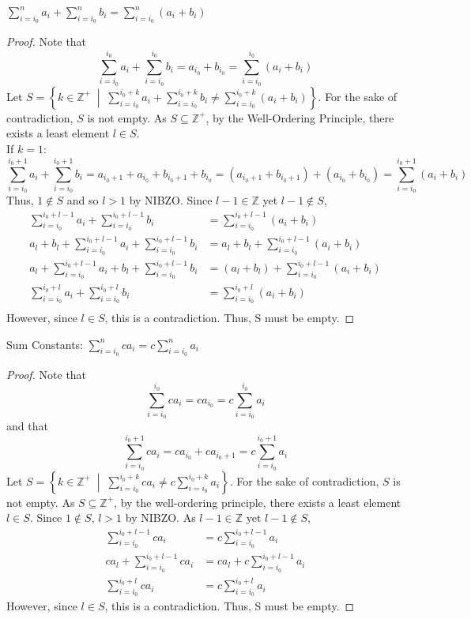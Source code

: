 \begin{lemma} $\sum\limits _{i=i_0}^{n}  a_i + \sum\limits _{i=i_0}^{n}  b_i = \sum\limits _{i=i_0}^{n} (a_i+b_i)$ \end{lemma}
\begin{proof}
Note that \[\sum_{i=i_0}^{i_0}  a_i+ \sum_{i=i_0}^{i_0}  b_i = a_{i_0}+b_{i_0}=\sum_{i=i_0}^{i_0}  (a_i+b_i)\]
Let $S=\left \{k \in \mathbb{Z}^+  \; \middle |  \;\sum\limits_{i=i_0}^{i_0+k}  a_i +  \sum\limits_{i=i_0}^{i_0+k}  b_i \neq  \sum\limits_{i=i_0}^{i_0+k} ( a_i +b_i)\right \}$. For the sake of contradiction, $S$ is not empty. As $S \subseteq \mathbb{Z}^+$, by the Well-Ordering Principle, there exists a least element $l \in S$. \\
If $k=1$: \[
 \sum_{i=i_0}^{i_0+1}  a_i+ \sum_{i=i_0}^{i_0+1}  b_i = a_{i_0+1}+ a_{i_0}+b_{i_0+1}+b_{i_0}= (a_{i_0+1}+b_{i_0+1})+(a_{i_0}+b_{i_0}) =\sum_{i=i_0}^{i_0+1}  (a_i+b_i)
\]
Thus, $1 \notin S$ and so $l>1$ by NIBZO. Since $l-1 \in \mathbb{Z}$ yet $l-1 \notin S$, 
\begin{align*} \sum\limits _{i=i_0}^{i_0+l-1}  a_i + \sum\limits _{i=i_0}^{i_0+l-1}  b_i &= \sum\limits _{i=i_0}^{i_0+l-1} (a_i+b_i) \\
a_l + b_l+\sum\limits _{i=i_0}^{i_0+l-1}  a_i + \sum\limits _{i=i_0}^{i_0+l-1}  b_i &= a_l + b_l+\sum\limits _{i=i_0}^{i_0+l-1} (a_i+b_i)\\
a_l + \sum\limits _{i=i_0}^{i_0+l-1}  a_i + b_l+\sum\limits _{i=i_0}^{i_0+l-1}  b_i &= (a_l + b_l)+\sum\limits _{i=i_0}^{i_0+l-1} (a_i+b_i)\\
\sum\limits _{i=i_0}^{i_0+l}  a_i + \sum\limits _{i=i_0}^{i_0+l}  b_i &= \sum\limits _{i=i_0}^{i_0+l} (a_i+b_i)\\
\end{align*}
However, since $l \in S$, this is a contradiction. Thus, S must be empty.\end{proof}

\begin{lemma}
Sum Constants: $\sum\limits _{i=i_0}^{n} ca_i = c\sum\limits _{i=i_0}^{n} a_i$\end{lemma}
\begin{proof} Note that \[
\sum\limits _{i=i_0}^{i_0} ca_i = ca_{i_0}=c\sum\limits _{i=i_0}^{i_0} a_i
\] 
and that 
\[
\sum\limits _{i=i_0}^{i_0+1} ca_i = ca_{i_0} + ca_{i_0+1}=c\sum\limits _{i=i_0}^{i_0+1} a_i
\] 
Let $S=\left \{k \in \mathbb{Z}^+  \;\middle| \;\sum\limits_{i=i_0}^{i_0+k}  ca_i \neq  c\sum\limits_{i=i_0}^{i_0+k} a_i\right \}$. For the sake of contradiction, $S$ is not empty. As $S \subseteq \mathbb{Z}^+$, by the well-ordering principle, there exists a least element $l \in S$. Since $1 \notin S$, $l>1$ by NIBZO. As $l-1 \in \mathbb{Z}$ yet $l-1 \notin S$, 
\begin{align*}
    \sum\limits_{i=i_0}^{i_0+l-1}  ca_i &=  c\sum\limits_{i=i_0}^{i_0+l-1} a_i \\
    ca_l + \sum\limits_{i=i_0}^{i_0+l-1}  ca_i &=  ca_l+c\sum\limits_{i=i_0}^{i_0+l-1} a_i \\
   \sum\limits_{i=i_0}^{i_0+l}  ca_i &=  c\sum\limits_{i=i_0}^{i_0+l} a_i 
\end{align*}
However, since $l \in S$, this is a contradiction. Thus, S must be empty.\end{proof}


